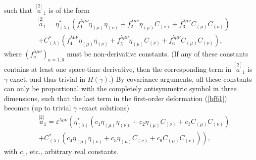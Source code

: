 \documentclass[a4paper,11pt]{article}
\begin{document}
such that $\stackrel{[2]}{a}_{1}$ is of the form
\begin{eqnarray}
&&\stackrel{\lbrack 2]}{a}_{1}=\eta _{(\lambda )}^{*}\left( f_{1}^{\lambda
\mu \nu }\eta _{(\mu )}\eta _{(\nu )}+f_{2}^{\lambda \mu \nu }\eta _{(\mu
)}C_{(\nu )}+f_{3}^{\lambda \mu \nu }C_{(\mu )}C_{(\nu )}\right)  \nonumber
\\
&&+C_{(\lambda )}^{*}\left( f_{4}^{\lambda \mu \nu }\eta _{(\mu )}\eta
_{(\nu )}+f_{5}^{\lambda \mu \nu }\eta _{(\mu )}C_{(\nu )}+f_{6}^{\lambda
\mu \nu }C_{(\mu )}C_{(\nu )}\right) ,  \label{bf64}
\end{eqnarray}
where $\left( f_{a}^{\lambda \mu \nu }\right) _{a=\overline{1,6}}$ must be
non-derivative constants. (If any of these constants contains at least one
space-time derivative, then the corresponding term in $\stackrel{[2]}{a}_{1}$
is $\gamma $-exact, and thus trivial in $H\left( \gamma \right) $.) By
covariance arguments, all these constants can only be proportional with the
completely antisymmetric symbol in three dimensions, such that the last term
in the first-order deformation (\ref{bf61}) becomes (up to trivial $\gamma $%
-exact solutions)
\begin{eqnarray}
&&\stackrel{\lbrack 2]}{a}_{1}=\varepsilon ^{\lambda \mu \nu }\left( \eta
_{(\lambda )}^{*}\left( c_{1}\eta _{(\mu )}\eta _{(\nu )}+c_{2}\eta _{(\mu
)}C_{(\nu )}+c_{3}C_{(\mu )}C_{(\nu )}\right) \right.  \nonumber \\
&&\left. +C_{(\lambda )}^{*}\left( c_{4}\eta _{(\mu )}\eta _{(\nu
)}+c_{5}\eta _{(\mu )}C_{(\nu )}+c_{6}C_{(\mu )}C_{(\nu )}\right) \right) ,
\label{bf65}
\end{eqnarray}
with $c_{1}$, etc., arbitrary real constants.
\end{document}
